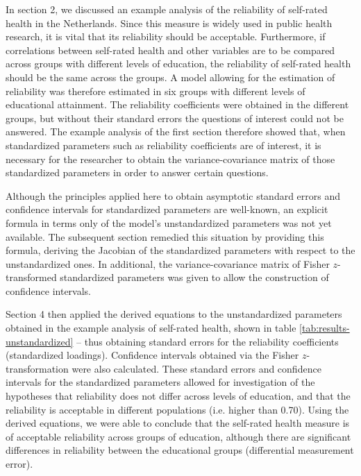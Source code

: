 \documentclass[a4paper,11pt]{article}
\newcommand{\0}{\boldsymbol{0}}
\begin{document}
In section 2, we discussed an example analysis of the reliability of self-rated health in the Netherlands. Since this measure is widely used in 
 public health research, it is vital that its reliability should be acceptable. Furthermore, if correlations between self-rated health and 
 other variables are to be compared across groups with different levels of education, the reliability of self-rated health should be the 
 same across the groups. A model allowing for the estimation of reliability was therefore estimated in six groups with different levels
 of educational attainment. The reliability coefficients were obtained in the different groups, but without their standard errors the questions
 of interest could not be answered.
The example analysis of the first section therefore showed that, when standardized parameters such as reliability coefficients are of interest, it is necessary for the researcher to obtain the variance-covariance matrix of those standardized parameters in order to answer certain questions.

Although the principles applied here to obtain asymptotic standard errors and confidence intervals for standardized parameters are well-known, 
an explicit formula in terms only of the model's unstandardized parameters was not yet available. The subsequent section remedied this situation by providing this formula, deriving the Jacobian of the standardized parameters with respect to the unstandardized ones. In additional, the 
variance-covariance matrix of Fisher $z$-transformed standardized parameters was given to allow the construction of confidence intervals.

Section 4 then applied the derived equations to the unstandardized parameters obtained in the example analysis of self-rated health, shown in table \ref{tab:results-unstandardized} -- thus obtaining standard errors for the reliability coefficients (standardized loadings). Confidence intervals obtained via the Fisher $z$-transformation were also calculated. These standard errors and confidence intervals for the standardized parameters allowed for 
investigation of the hypotheses that reliability does not differ across levels of education, and that the reliability is acceptable in 
different populations (i.e. higher than 0.70). Using the derived equations, we were able to conclude that the self-rated health measure
is of acceptable reliability across groups of education, although there are significant differences in reliability between the educational groups (differential measurement error).
\end{document}
